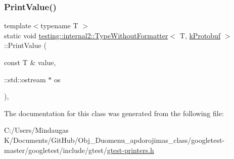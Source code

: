 \mbox{\label{classtesting_1_1internal2_1_1_type_without_formatter_3_01_t_00_01k_protobuf_01_4_ac96fb775dc776f02da9a671ea0e04599}} 
\subsubsection{\texorpdfstring{PrintValue()}{PrintValue()}\hspace{0.1cm}{\footnotesize\ttfamily [3/3]}}
{\footnotesize\ttfamily template$<$typename T $>$ \\
static void \mbox{\hyperlink{classtesting_1_1internal2_1_1_type_without_formatter}{testing\+::internal2\+::\+Type\+Without\+Formatter}}$<$ T, \mbox{\hyperlink{namespacetesting_1_1internal2_aeb8161b0b3ee503347b0662d7028fd57ab6c394f7612d98d3a4a0514b2d6eb840}{k\+Protobuf}} $>$\+::Print\+Value (\begin{DoxyParamCaption}\item[{const T \&}]{value,  }\item[{\+::std\+::ostream $\ast$}]{os }\end{DoxyParamCaption})\hspace{0.3cm}{\ttfamily [inline]}, {\ttfamily [static]}}



The documentation for this class was generated from the following file\+:\begin{DoxyCompactItemize}
\item 
C\+:/\+Users/\+Mindaugas K/\+Documents/\+Git\+Hub/\+Obj\+\_\+\+Duomenu\+\_\+apdorojimas\+\_\+class/googletest-\/master/googletest/include/gtest/\mbox{\hyperlink{googletest-master_2googletest_2include_2gtest_2gtest-printers_8h}{gtest-\/printers.\+h}}\end{DoxyCompactItemize}
